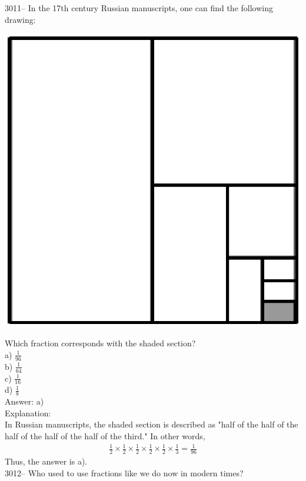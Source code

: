 \documentclass[letterpaper, 12pt]{article}
\begin{document}
3011-- In the 17th century Russian manuscripts, one can find the following drawing:\\
\begin{center}
\includegraphics[scale=0.3]{carre_proportions.eps}
\end{center}
Which fraction corresponds with the shaded section?\\

a) $\frac{1}{96}$\\[2mm]
b) $\frac{1}{64}$\\[2mm]
c) $\frac{1}{16}$\\[2mm]
d) $\frac{1}{8}$\\

Answer: a)\\

Explanation:\\
In Russian manuscripts, the shaded section is described as "half of the half of the half of the half of the half of the third." In other words,
\begin{eqnarray*}
\frac{1}{2} \times \frac{1}{2} \times \frac{1}{2} \times \frac{1}{2} \times \frac{1}{2} \times \frac{1}{3} = \frac{1}{96}
\end{eqnarray*}
Thus, the answer is a).\\



3012-- Who used to use fractions like we do now in modern times?\\
\end{document}
